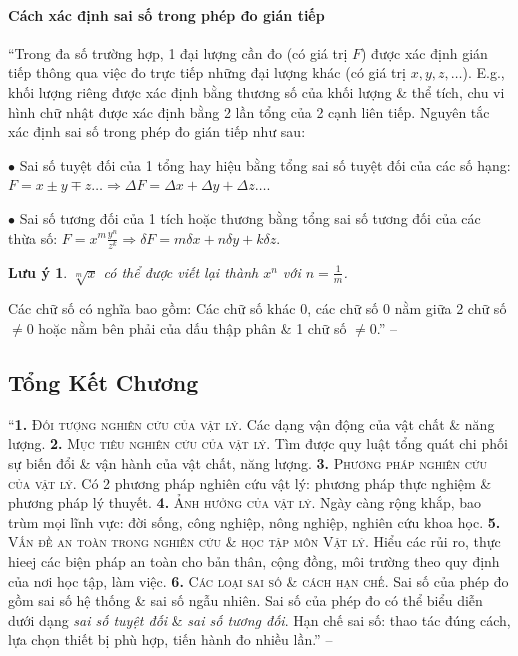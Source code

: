 \documentclass{article}
\numberwithin{equation}{section}
\newtheorem{luuy}{Lưu ý}[section]
\begin{document}
\paragraph{Cách xác định sai số trong phép đo gián tiếp}
``Trong đa số trường hợp, 1 đại lượng cần đo (có giá trị $F$) được xác định gián tiếp thông qua việc đo trực tiếp những đại lượng khác (có giá trị $x,y,z,\ldots$). E.g., khối lượng riêng được xác định bằng thương số của khối lượng \& thể tích, chu vi hình chữ nhật được xác định bằng 2 lần tổng của 2 cạnh liên tiếp. Nguyên tắc xác định sai số trong phép đo gián tiếp như sau:
\begin{enumerate*}
	\item[$\bullet$] Sai số tuyệt đối của 1 tổng hay hiệu bằng tổng sai số tuyệt đối của các số hạng: $F = x\pm y\mp z\ldots\Rightarrow\Delta F = \Delta x + \Delta y + \Delta z\ldots$.
	\item[$\bullet$] Sai số tương đối của 1 tích hoặc thương bằng tổng sai số tương đối của các thừa số: $F = x^m\frac{y^n}{z^k}\Rightarrow\delta F = m\delta x + n\delta y + k\delta z$. 
\end{enumerate*}

\begin{luuy}
	$\sqrt[m]{x}$ có thể được viết lại thành $x^n$ với $n = \frac{1}{m}$. 
\end{luuy}
Các chữ số có nghĩa bao gồm: Các chữ số khác $0$, các chữ số $0$ nằm giữa 2 chữ số $\ne 0$ hoặc nằm bên phải của dấu thập phân \& 1 chữ số $\ne 0$.'' -- \cite[pp. 21--22]{SGK_Vat_Ly_10_Chan_Troi_Sang_Tao}

\subsection{Tổng Kết Chương}
``\textbf{1.} \textsc{Đối tượng nghiên cứu của vật lý.} Các dạng vận động của vật chất \& năng lượng. \textbf{2.} \textsc{Mục tiêu nghiên cứu của vật lý.} Tìm được quy luật tổng quát chi phối sự biến đổi \& vận hành của vật chất, năng lượng. \textbf{3.} \textsc{Phương pháp nghiên cứu của vật lý.} Có 2 phương pháp nghiên cứu vật lý: phương pháp thực nghiệm \& phương pháp lý thuyết. \textbf{4.} \textsc{Ảnh hưởng của vật lý.} Ngày càng rộng khắp, bao trùm mọi lĩnh vực: đời sống, công nghiệp, nông nghiệp, nghiên cứu khoa học. \textbf{5.} \textsc{Vấn đề an toàn trong nghiên cứu \& học tập môn Vật lý.} Hiểu các rủi ro, thực hieej các biện pháp an toàn cho bản thân, cộng đồng, môi trường theo quy định của nơi học tập, làm việc. \textbf{6.} \textsc{Các loại sai số \& cách hạn chế.} Sai số của phép đo gồm sai số hệ thống \& sai số ngẫu nhiên. Sai số của phép đo có thể biểu diễn dưới dạng \textit{sai số tuyệt đối} \& \textit{sai số tương đối}. Hạn chế sai số: thao tác đúng cách, lựa chọn thiết bị phù hợp, tiến hành đo nhiều lần.'' -- \cite[pp. 23]{SGK_Vat_Ly_10_Chan_Troi_Sang_Tao}
\end{document}
